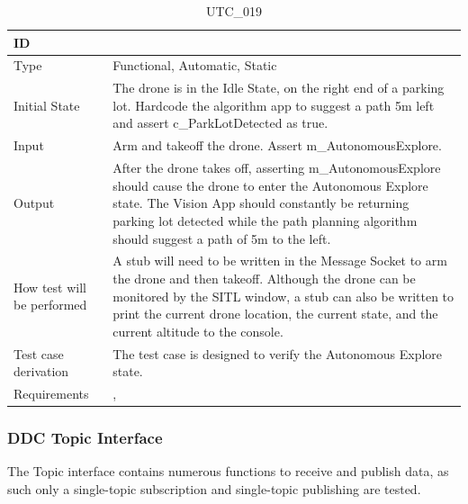 \documentclass[12pt, titlepage]{article}
\begin{document}
\begin{table}[!h]
\begin{center}
\caption {UTC\_019}
\label{tab:UTC_019}
\begin{tabular}{ | m{3.2cm} | m{12.2cm} | } 
\hline
ID & \nameref{tab:UTC_019} \\ 
\hline
Type &  Functional, Automatic, Static  \\ 
\hline
Initial State & The drone is in the Idle State, on the right end of a parking lot. Hardcode the algorithm app to suggest a path 5m left and assert c\_ParkLotDetected as true. \\ 
\hline
Input &  Arm and takeoff the drone.  Assert m\_AutonomousExplore.  \\ 
\hline
Output &  After the drone takes off, asserting m\_AutonomousExplore should cause the drone to enter the Autonomous Explore state. The Vision App should constantly be returning parking lot detected while the path planning algorithm should suggest a path of 5m to the left.\\  
\hline
How test will be performed & A stub will need to be written in the Message Socket to arm the drone and then takeoff. Although the drone can be monitored by the SITL window, a stub can also be written to print the current drone location, the current state, and the current altitude to the console.\\ 
\hline
Test case derivation &  The test case is designed to verify the Autonomous Explore state. \\ 
\hline
Requirements & \nameref{STA_003}, \nameref{TRANS_004} \\ 
\hline
\end{tabular}
\end{center}
\end{table}

\clearpage

\subsubsection{DDC Topic Interface}

The Topic interface contains numerous functions to receive and publish data, as such only a single-topic subscription and single-topic publishing are tested.
\end{document}
